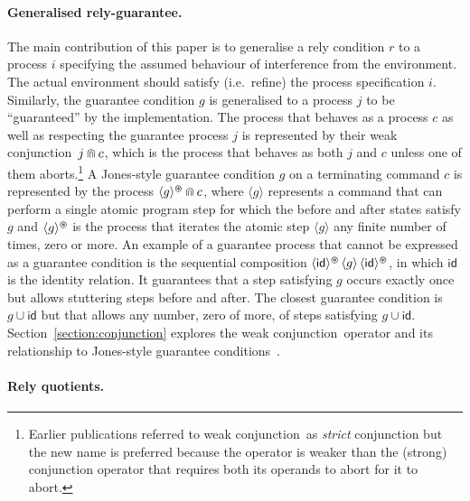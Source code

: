 \documentclass[fleqn]{fac}
\newcommand{\SSeq}{\,}
\newcommand{\atomicrel}[1]{\langle#1\rangle}
\newcommand{\FinSkipIter}{^{\varoast}}
\newcommand{\FinGuar}[1]{\atomicrel{#1}\FinSkipIter}
\newcommand{\id}{\mathsf{id}}
\newcommand{\strictconjunction}{weak conjunction}
\newcommand{\together}{\mathbin{\doublecap}}
\begin{document}
\paragraph{Generalised rely-guarantee.}

The main contribution of this paper is to generalise a rely condition $r$ to 
a process $i$ specifying the assumed behaviour of interference from the environment.
The actual environment should satisfy (i.e.\ refine) the process specification $i$.
Similarly, the guarantee condition $g$ is generalised to a process $j$
to be ``guaranteed'' by the implementation.
The process that behaves as a process $c$ as well as respecting the guarantee process $j$
is represented by their \strictconjunction\ $j \together c$,
which is the process that behaves as both $j$ and $c$ unless one of them aborts.\footnote{Earlier publications referred to \strictconjunction\ as \emph{strict} conjunction
but the new name is preferred because the operator is weaker than the (strong) conjunction operator 
that requires both its operands to abort for it to abort.}
A Jones-style guarantee condition $g$ on a terminating command $c$ is represented by 
the process $\FinGuar{g} \together c$,
where 
$\atomicrel{g}$ represents a command that can perform a single atomic program step 
for which the before and after states satisfy $g$
and
$\FinGuar{g}$ is the process 
that iterates the atomic step $\atomicrel{g}$ any finite number
of times, zero or more.
An example of a guarantee process that cannot be expressed as a guarantee condition is
the sequential composition 
$\FinGuar{\id} \SSeq \atomicrel{g} \SSeq \FinGuar{\id}$,
in which $\id$ is the identity relation.
It guarantees that a step satisfying $g$ occurs exactly once but allows stuttering 
steps before and after.
The closest guarantee condition is $g \cup \id$ but that allows any number, zero of more, of steps satisfying $g \cup \id$.
Section~\ref{section:conjunction} explores the \strictconjunction\ operator and 
its relationship to Jones-style guarantee conditions~\cite{FACJexSEFM-14}.


\paragraph{Rely quotients.}
\end{document}
